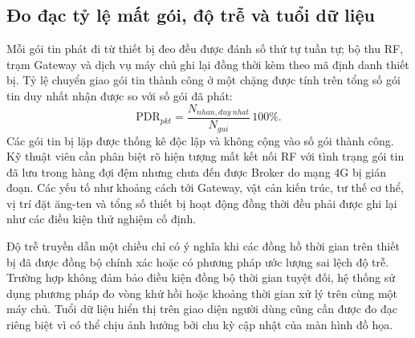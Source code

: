 \subsection{Đo đạc tỷ lệ mất gói, độ trễ và tuổi dữ liệu}
Mỗi gói tin phát đi từ thiết bị đeo đều được đánh số thứ tự tuần tự; bộ thu RF, trạm Gateway và dịch vụ máy chủ ghi lại đồng thời kèm theo mã định danh thiết bị. Tỷ lệ chuyển giao gói tin thành công ở một chặng được tính trên tổng số gói tin duy nhất nhận được so với số gói đã phát:
\begin{equation}
\mathrm{PDR}_{pkt}=\frac{N_{nhan,duy\ nhat}}{N_{gui}}\,100\%.
\end{equation}
Các gói tin bị lặp được thống kê độc lập và không cộng vào số gói thành công. Kỹ thuật viên cần phân biệt rõ hiện tượng mất kết nối RF với tình trạng gói tin đã lưu trong hàng đợi đệm nhưng chưa đến được Broker do mạng 4G bị gián đoạn. Các yếu tố như khoảng cách tới Gateway, vật cản kiến trúc, tư thế cơ thể, vị trí đặt ăng-ten và tổng số thiết bị hoạt động đồng thời đều phải được ghi lại như các điều kiện thử nghiệm cố định.

Độ trễ truyền dẫn một chiều chỉ có ý nghĩa khi các đồng hồ thời gian trên thiết bị đã được đồng bộ chính xác hoặc có phương pháp ước lượng sai lệch độ trễ. Trường hợp không đảm bảo điều kiện đồng bộ thời gian tuyệt đối, hệ thống sử dụng phương pháp đo vòng khứ hồi hoặc khoảng thời gian xử lý trên cùng một máy chủ. Tuổi dữ liệu hiển thị trên giao diện người dùng cũng cần được đo đạc riêng biệt vì có thể chịu ảnh hưởng bởi chu kỳ cập nhật của màn hình đồ họa.

